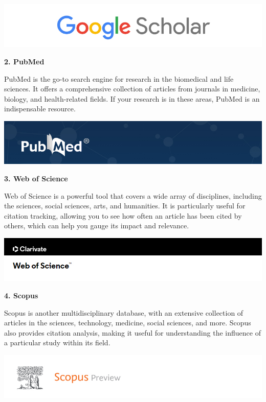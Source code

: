 \documentclass[
]{book}
\begin{document}
\href{https://scholar.google.com/}{\includegraphics[width=1\linewidth,height=\textheight,keepaspectratio]{images/google-scholar.jpg}}

\textbf{2. PubMed}

PubMed is the go-to search engine for research in the biomedical and life sciences. It offers a comprehensive collection of articles from journals in medicine, biology, and health-related fields. If your research is in these areas, PubMed is an indispensable resource.

\href{https://pubmed.ncbi.nlm.nih.gov/}{\includegraphics[width=1\linewidth,height=\textheight,keepaspectratio]{images/pubmed.jpg}}

\textbf{3. Web of Science}

Web of Science is a powerful tool that covers a wide array of disciplines, including the sciences, social sciences, arts, and humanities. It is particularly useful for citation tracking, allowing you to see how often an article has been cited by others, which can help you gauge its impact and relevance.

\href{https://go.openathens.net/redirector/siue.edu?url=https\%3A\%2F\%2Fwebofknowledge.com\%2FWOS}{\includegraphics[width=1\linewidth,height=\textheight,keepaspectratio]{images/web-of-science.jpg}}

\textbf{4. Scopus}

Scopus is another multidisciplinary database, with an extensive collection of articles in the sciences, technology, medicine, social sciences, and more. Scopus also provides citation analysis, making it useful for understanding the influence of a particular study within its field.

\href{https://www.scopus.com/home.uri}{\includegraphics[width=1\linewidth,height=\textheight,keepaspectratio]{images/scopus.jpg}}
\end{document}
